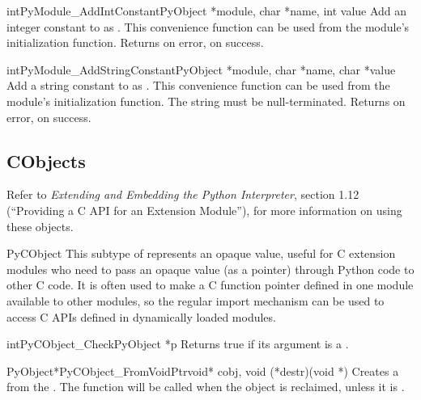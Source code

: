 \documentclass{manual}
\begin{document}
\begin{cfuncdesc}{int}{PyModule_AddIntConstant}{PyObject *module,
                                                char *name, int value}
Add an integer constant to  as .  This convenience
function can be used from the module's initialization function.
Returns  on error,  on success.
\end{cfuncdesc}

\begin{cfuncdesc}{int}{PyModule_AddStringConstant}{PyObject *module,
                                                   char *name, char *value}
Add a string constant to  as .  This convenience
function can be used from the module's initialization function.  The
string  must be null-terminated.  Returns  on
error,  on success.
\end{cfuncdesc}


\subsection{CObjects \label{cObjects}}

Refer to \emph{Extending and Embedding the Python Interpreter},
section 1.12 (``Providing a C API for an Extension Module''), for more 
information on using these objects.


\begin{ctypedesc}{PyCObject}
This subtype of  represents an opaque value, useful for
C extension modules who need to pass an opaque value (as a
 pointer) through Python code to other C code.  It is
often used to make a C function pointer defined in one module
available to other modules, so the regular import mechanism can be
used to access C APIs defined in dynamically loaded modules.
\end{ctypedesc}

\begin{cfuncdesc}{int}{PyCObject_Check}{PyObject *p}
Returns true if its argument is a .
\end{cfuncdesc}

\begin{cfuncdesc}{PyObject*}{PyCObject_FromVoidPtr}{void* cobj, 
	void (*destr)(void *)}
Creates a  from the .  The
 function will be called when the object is reclaimed, unless
it is \NULL.
\end{cfuncdesc}
\end{document}
